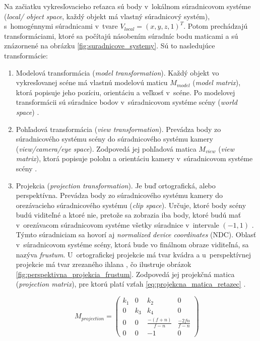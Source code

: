 Na začiatku vykresľovacieho reťazca sú body v~lokálnom súradnicovom systéme (\emph{\mbox{local}/ object space}, každý objekt má vlastný súradnicový systém), s~homogénnymi súradnicami v~tvare $V_{local} = (x, y, z, 1)^T$. Potom prechádzajú transformáciami, ktoré sa počítajú násobením súradníc bodu maticami a sú znázornené na obrázku \ref{fig:suradnicove_systemy}. Sú to nasledujúce transformácie:

\begin{enumerate}
    \item Modelová transformácia (\emph{model transformation}). Každý objekt vo vykresľovanej scéne má vlastnú modelovú maticu $M_{model}$ (\emph{model matrix}), ktorá popisuje jeho pozíciu, orientáciu a veľkosť v~scéne. Po modelovej transformácii sú súradnice bodov v~súradnicovom systéme scény (\emph{world space}) \cite{de_vries_coordinate_systems, stemkoski_graphics}.
    \item Pohľadová transformácia (\emph{view transformation}). Prevádza body zo súradnicového systému scény do súradnicového systému kamery (\emph{view/camera/eye space}). Zodpovedá jej pohľadová matica $M_{view}$ (\emph{view matrix}), ktorá popisuje polohu a orientáciu kamery v~súradnicovom systéme scény \cite{de_vries_coordinate_systems, stemkoski_graphics}. 
    \item Projekcia (\emph{projection transformation}). Je buď ortografická, alebo perspektívna. Prevádza body zo súradnicového systému kamery do orezávacieho súradnicového systému (\emph{clip space}). Určuje, ktoré body scény budú viditeľné a ktoré nie, pretože sa zobrazia iba body, ktoré budú mať v~orezávacom súradnicovom systéme všetky súradnice v~intervale $(-1, 1)$ \cite{stemkoski_graphics}. Týmto súradniciam sa hovorí aj \emph{normalized device coordinates} (NDC). Oblasť v~súradnicovom systéme scény, ktorá bude vo finálnom obraze viditeľná, sa nazýva \emph{frustum}. U~ortografickej projekcie má tvar kvádra a u~perspektívnej projekcie má tvar zrezaného ihlana \cite{de_vries_coordinate_systems}, čo ilustruje obrázok \ref{fig:perspektivna_projekcia_frustum}. Zodpovedá jej projekčná matica (\emph{projection matrix}), pre ktorú platí vzťah \ref{eq:projekcna_matica_retazec} \cite{ahn_projection_matrix}.

    \label{eq:koeficienty_skreslenia}

    \begin{equation}
    M_{projection} = 
    \begin{pmatrix}
    k_1 & 0 & k_2 & 0 \\
    0 & k_3 & k_4 & 0 \\
    0 & 0 & \frac{-(f+n)}{f-n} & \frac{-2fn}{f-n} \\
    0 & 0 & -1 & 0
    \end{pmatrix}
    \label{eq:projekcna_matica_retazec}
    \end{equation}


\end{enumerate}
